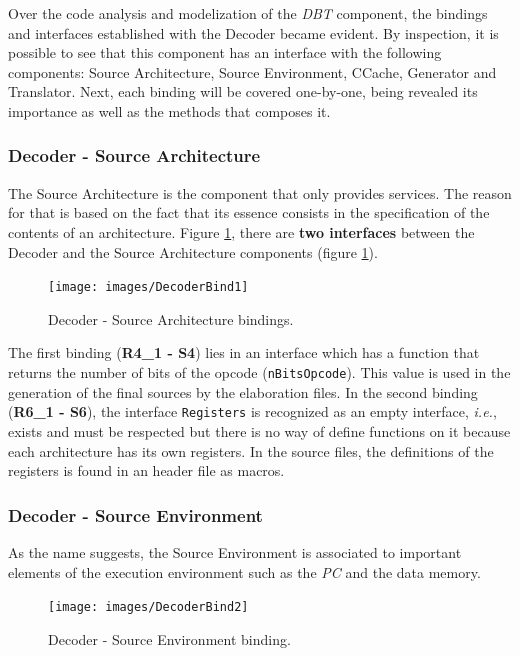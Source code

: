 \documentclass[12pt]{article}
\begin{document}
{Over the code analysis and modelization of the \textit{DBT} component, the bindings and interfaces established with the Decoder became evident. By inspection, it is possible to see that this component has an interface with the following components: Source Architecture, Source Environment, CCache, Generator and Translator. Next, each binding will be covered one-by-one, being revealed its importance as well as the methods that composes it.

\subsubsection*{Decoder - Source Architecture}
    The Source Architecture is the component that only provides services. The reason for that is based on the fact that its essence consists in the specification of the contents of an architecture. Figure \ref{fig:DecoderBind1}, there are \textbf{two interfaces} between the Decoder and the Source Architecture components (figure \ref{fig:DecoderBind1}).
    
    \begin{figure}[!htb]
    \centerline{
    \texttt{[image: images/DecoderBind1]}
    }
    \caption{Decoder - Source Architecture bindings.}
    \label{fig:DecoderBind1} 
    \end{figure}
    
    The first binding (\textbf{R4\_1 - S4}) lies in an interface which has a function that returns the number of bits of the opcode (\texttt{nBitsOpcode}). This value is used in the generation of the final sources by the elaboration files. In the second binding (\textbf{R6\_1 - S6}), the interface \texttt{Registers} is recognized as an empty interface, \textit{i.e.}, exists and must be respected but there is no way of define functions on it because each architecture has its own registers. In the source files, the definitions of the registers is found in an header file as macros.


\subsubsection*{Decoder - Source Environment}
    As the name suggests, the Source Environment is associated to important elements of the execution environment such as the \textit{PC} and the data memory. 
    
    \begin{figure}[!htb]
    \centerline{
    \texttt{[image: images/DecoderBind2]}
    }
    \caption{Decoder - Source Environment binding.}
    \label{fig:DecoderBind2} 
    \end{figure}
    
}
\end{document}
